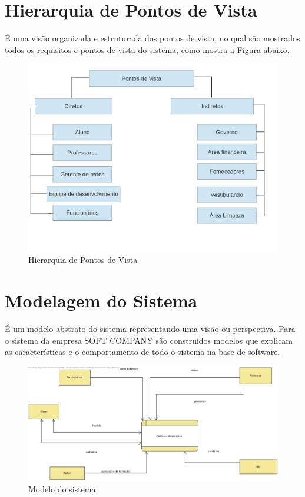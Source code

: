 \section {Hierarquia de Pontos de Vista}
	
É uma visão organizada e estruturada dos pontos de vista, no qual são mostrados todos os requisitos e pontos de vista do sistema, como mostra a Figura abaixo.
   \begin{figure}[H]
	      \centering
	       \includegraphics{hierarquia2}
	       \caption{Hierarquia de Pontos de Vista}
	       \label{figRotulo}
               \end{figure}
               
               
    
 \section{Modelagem do Sistema}
 
 É um modelo abstrato do sistema representando uma visão ou perspectiva.
 Para o sistema da empresa SOFT COMPANY são construídos modelos que explicam as características
 e o comportamento de todo o sistema na base de software.
 
   \begin{figure}[H]
	      \centering
	       \includegraphics{diagrama1.jpg}
	       \caption{Modelo do sistema}
	       \label{figRotulo}
               \end{figure}
               
